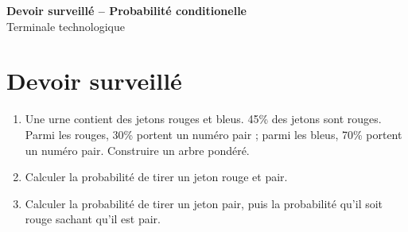 \documentclass[french,11pt]{book}
\begin{document}
\begin{center}
{\Large \textbf{Devoir surveillé -- Probabilité conditionelle}}\\[2mm]
Terminale technologique
\end{center}

\section*{Devoir surveillé}
\begin{enumerate}
  \item Une urne contient des jetons rouges et bleus. 45\% des jetons sont rouges. Parmi les rouges, 30\% portent un numéro pair ; parmi les bleus, 70\% portent un numéro pair. Construire un arbre pondéré.
  \item Calculer la probabilité de tirer un jeton rouge et pair.
  \item Calculer la probabilité de tirer un jeton pair, puis la probabilité qu'il soit rouge sachant qu'il est pair.
\end{enumerate}
\end{document}
